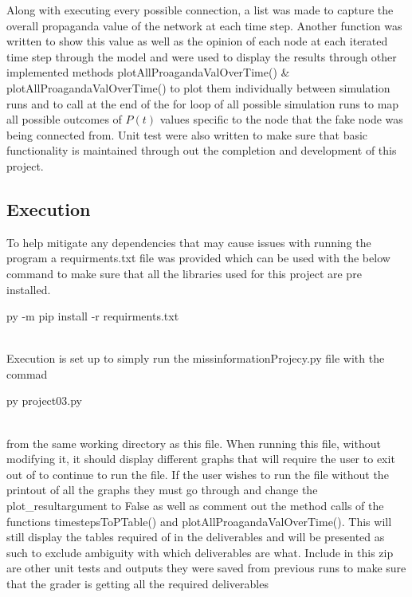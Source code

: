 \documentclass[letterpaper]{article}
\begin{document}
Along with executing every possible connection, a list was made to capture the overall propaganda value of the network at each time step.  Another function was written to show this value as well as the opinion of each node at each iterated time step through the model and were used to display the results through other implemented methods plotAllProagandaValOverTime() \& plotAllProagandaValOverTime() to plot them individually between simulation runs and to call at the end of the for loop of all possible simulation runs to map all possible outcomes of $P(t)$ values specific to the node that the fake node was being connected from.  Unit test were also written to make sure that basic functionality is maintained through out the completion and development of this project.

\subsection{Execution}
To help mitigate any dependencies that may cause issues with running the program a requirments.txt file was provided which can be used with the below command to make sure that all the libraries used for this project are pre installed.\\
\begin{center}
py -m pip install -r requirments.txt\\
\quad \\
\end{center}
Execution is set up to simply run the missinformationProjecy.py file with the commad\\
\begin{center}
py project03.py\\
\quad \\
\end{center}
from the same working directory as this file. When running this file, without modifying it, it should display different graphs that will require the user to exit out of to continue to run the file.  If the user wishes to run the file without the printout of all the graphs they must go through and change the plot\_resultargument to False as well as comment out the method calls of the functions timestepsToPTable() and plotAllProagandaValOverTime().  This will still display the tables required of in the deliverables and will be presented as such to exclude ambiguity with which deliverables are what. 
Include in this zip are other unit tests and outputs they were saved from previous runs to make sure that the grader is getting all the required deliverables \\
\end{document}
